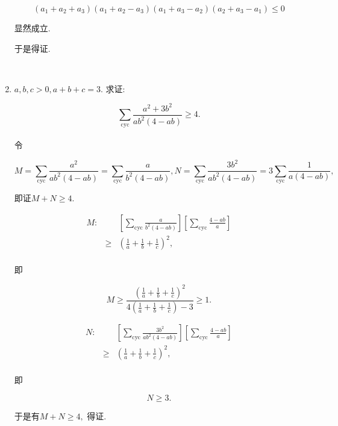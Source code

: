 \documentclass[8pt]{article}
\begin{document}
\begin{enumerate}
			$$(a_1+a_2+a_3)(a_1+a_2-a_3)(a_1+a_3-a_2)(a_2+a_3-a_1)\leq 0$$

			显然成立.

			于是得证.

		~\\

		\item $a, b, c > 0, a+b+c=3$. 求证:

			$$\sum_{\mathrm{cyc}}\frac{a^2+3b^2}{ab^2(4-ab)}\geq 4.$$
			~\\

			令

			$$M=\sum_{\mathrm{cyc}}\frac{a^2}{ab^2(4-ab)}=\sum_{\mathrm{cyc}}\frac{a}{b^2(4-ab)}, N=\sum_{\mathrm{cyc}}\frac{3b^2}{ab^2(4-ab)}=3\sum_{\mathrm{cyc}}\frac{1}{a(4-ab)},$$

			即证$M+N\geq 4.$

			$$
			\begin{array}{rcl}
			M:&&\displaystyle \left[\sum_{\mathrm{cyc}} \frac{a}{b^2 (4-ab)}\right]\left[\sum_{\mathrm{cyc}}\frac{4-ab}{a}\right]\\
			&\geq&\displaystyle \left(\frac{1}{a}+\frac{1}{b}+\frac{1}{c}\right)^2,\\
			\end{array}
			$$

			即

			$$M\geq\frac{\left(\frac{1}{a}+\frac{1}{b}+\frac{1}{c}\right)^2}{4\left(\frac{1}{a}+\frac{1}{b}+\frac{1}{c}\right)-3}\geq 1.$$

			$$
			\begin{array}{rcl}
			N:&&\displaystyle \left[\sum_{\mathrm{cyc}}\frac{3b^2}{ab^2(4-ab)}\right]\left[\sum_{\mathrm{cyc}}\frac{4-ab}{a}\right]\\
			&\geq&\displaystyle \left(\frac{1}{a}+\frac{1}{b}+\frac{1}{c}\right)^2,\\
			\end{array}
			$$

			即

			$$N\geq3.$$

			于是有$M+N\geq 4,$ 得证.

	\end{enumerate}
\end{document}
